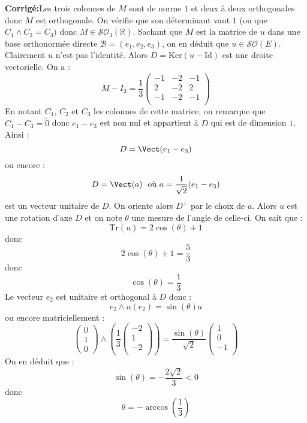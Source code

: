 \documentclass[a4paper,twoside,french,11pt]{VcCours}
\newcommand{\corr}{\textbf{Corrigé:}}
\begin{document}
\corr Les trois colonnes de $M$ sont de norme $1$ et deux à deux orthogonales donc $M$ est orthogonale. On vérifie que son déterminant vaut $1$ (ou que $C_1 \wedge C_2 = C_3)$ donc $M \in \mathcal{S}\mathcal{O}_3(\mathbb{R})$. Sachant que $M$ est la matrice de $u$ dans une base orthonormée directe $\mathcal{B}=(e_1,e_2,e_3)$, on en déduit que $u \in   \mathcal{S}\mathcal{O}(E)$. Clairement $u$ n'est pas l'identité. Alors $D=\textrm{Ker}(u - \textrm{Id})$ est une droite vectorielle. On a :
$$ M - I_3 = \dfrac{1}{3} \begin{pmatrix}
-1 & -2 & -1 \\
2 & -2 & 2 \\
-1 & -2 & -1 \\
\end{pmatrix}$$
En notant $C_1$, $C_2$ et $C_3$ les colonnes de cette matrice, on remarque que $C_1-C_3= \tilde{0}$ donc $e_1-e_3$ est non nul et appartient à $D$ qui est de dimension $1$. Ainsi :
$$ D= \Vect(e_1-e_3)$$
ou encore :
$$ D = \Vect(a) \; \hbox{ où } a = \dfrac{1}{\sqrt{2}} (e_1-e_3)$$
est un vecteur unitaire de $D$. On oriente alors $D^{\perp}$ par le choix de $a$. Alors $u$ est une rotation d'axe $D$ et on note $\theta$ une mesure de l'angle de celle-ci. On sait que :
$$ \textrm{Tr}(u) = 2 \cos(\theta) + 1 $$
donc
$$ 2 \cos(\theta) + 1 = \dfrac{5}{3}$$
donc
$$ \cos(\theta) =  \dfrac{1}{3}$$
Le vecteur $e_2$ est unitaire et orthogonal à $D$ donc :
$$ e_2 \wedge u(e_2) = \sin(\theta) a$$
ou encore matriciellement :
$$ \begin{pmatrix}
0 \\
1 \\
0
\end{pmatrix} \wedge \left( \dfrac{1}{3} \begin{pmatrix}
-2 \\
1 \\
-2 \\
\end{pmatrix}\right) = \frac{\sin(\theta)}{\sqrt{2}} \begin{pmatrix}
1 \\
0 \\
-1 \\
\end{pmatrix}$$
On en déduit que :
$$ \sin(\theta) = -\dfrac{2\sqrt{2}}{3}<0$$
donc
$$ \theta = - \arccos \left( \dfrac{1}{3} \right)$$
\end{document}
